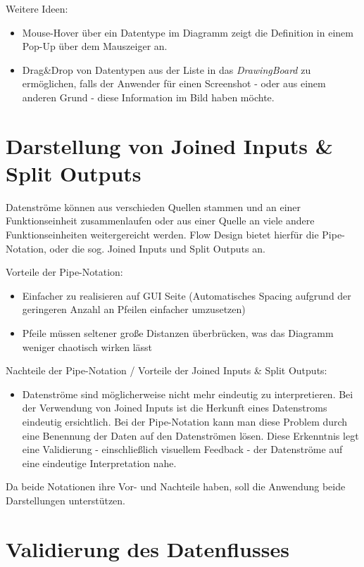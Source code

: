Weitere Ideen: 
\begin{itemize}
\item Mouse-Hover über ein Datentype im Diagramm zeigt die Definition in einem Pop-Up
über dem Mauszeiger an.
\item Drag\&Drop von Datentypen aus der Liste in das \textit{DrawingBoard} zu
ermöglichen, falls der Anwender für einen Screenshot - oder aus einem anderen
Grund - diese Information im Bild haben möchte.
\end{itemize}


\section{Darstellung von Joined Inputs \& Split Outputs}

Datenströme können aus verschieden Quellen stammen und an einer Funktionseinheit
zusammenlaufen oder aus einer Quelle an viele andere Funktionseinheiten weitergereicht werden. Flow Design bietet hierfür die Pipe-Notation, oder die sog. Joined Inputs und Split Outputs an. 

\bigskip

Vorteile der Pipe-Notation:

\begin{itemize}
\item Einfacher zu realisieren auf GUI Seite (Automatisches Spacing aufgrund der
geringeren Anzahl an Pfeilen einfacher umzusetzen)
\item Pfeile müssen seltener große Distanzen überbrücken, was das Diagramm weniger
chaotisch wirken lässt
\end{itemize}

Nachteile der Pipe-Notation / Vorteile der Joined Inputs \& Split Outputs:

\begin{itemize}
\item Datenströme sind möglicherweise nicht mehr eindeutig zu interpretieren. 
Bei der Verwendung von Joined Inputs ist die Herkunft eines Datenstroms eindeutig
ersichtlich. Bei der Pipe-Notation kann man diese Problem durch eine Benennung der Daten auf den Datenströmen lösen. Diese Erkenntnis legt eine Validierung - einschließlich visuellem Feedback - der Datenströme auf eine eindeutige Interpretation nahe.
\end{itemize}

Da beide Notationen ihre Vor- und Nachteile haben, soll die Anwendung beide Darstellungen unterstützen.

\section{Validierung des Datenflusses}

